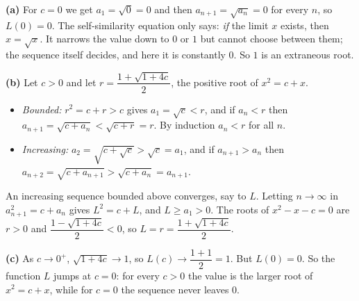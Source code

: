 \textbf{(a)} For $c=0$ we get $a_1=\sqrt0=0$ and then $a_{n+1}=\sqrt{a_n}=0$ for every $n$, so $L(0)=\boxed{0}$. The self-similarity equation only says: \emph{if} the limit $x$ exists, then $x=\sqrt x$. It narrows the value down to $0$ or $1$ but cannot choose between them; the sequence itself decides, and here it is constantly $0$. So $1$ is an extraneous root.

\textbf{(b)} Let $c>0$ and let $r=\dfrac{1+\sqrt{1+4c}}{2}$, the positive root of $x^2=c+x$.
\begin{itemize}
\item \emph{Bounded:} $r^2=c+r>c$ gives $a_1=\sqrt c<r$, and if $a_n<r$ then $a_{n+1}=\sqrt{c+a_n}<\sqrt{c+r}=r$. By induction $a_n<r$ for all $n$.
\item \emph{Increasing:} $a_2=\sqrt{c+\sqrt c}>\sqrt c=a_1$, and if $a_{n+1}>a_n$ then $a_{n+2}=\sqrt{c+a_{n+1}}>\sqrt{c+a_n}=a_{n+1}$.
\end{itemize}
An increasing sequence bounded above converges, say to $L$. Letting $n\to\infty$ in $a_{n+1}^2=c+a_n$ gives $L^2=c+L$, and $L\ge a_1>0$. The roots of $x^2-x-c=0$ are $r>0$ and $\dfrac{1-\sqrt{1+4c}}{2}<0$, so $L=r=\dfrac{1+\sqrt{1+4c}}{2}$.

\textbf{(c)} As $c\to0^+$, $\sqrt{1+4c}\to1$, so $L(c)\to\dfrac{1+1}{2}=1$. But $L(0)=0$. So the function $L$ jumps at $c=0$: for every $c>0$ the value is the larger root of $x^2=c+x$, while for $c=0$ the sequence never leaves $0$.
